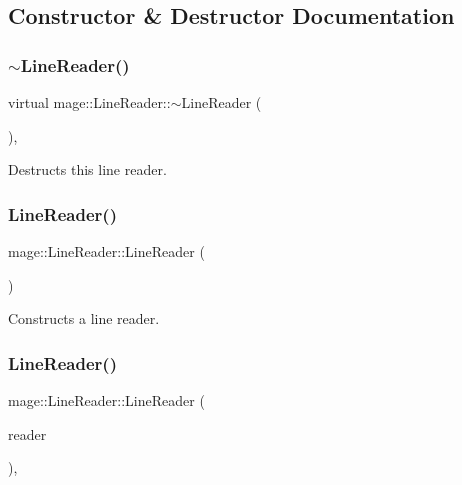 \subsection{Constructor \& Destructor Documentation}
\hypertarget{classmage_1_1_line_reader_aa058c338d8256d7f7b775bf4f7052508}{}\label{classmage_1_1_line_reader_aa058c338d8256d7f7b775bf4f7052508} 
\subsubsection{\texorpdfstring{$\sim$\+Line\+Reader()}{~LineReader()}}
{\footnotesize\ttfamily virtual mage\+::\+Line\+Reader\+::$\sim$\+Line\+Reader (\begin{DoxyParamCaption}{ }\end{DoxyParamCaption})\hspace{0.3cm}{\ttfamily [virtual]}, {\ttfamily [default]}}

Destructs this line reader. \hypertarget{classmage_1_1_line_reader_ab4a46321d7ea3ecda2d6390c78a7285b}{}\label{classmage_1_1_line_reader_ab4a46321d7ea3ecda2d6390c78a7285b} 
\subsubsection{\texorpdfstring{Line\+Reader()}{LineReader()}\hspace{0.1cm}{\footnotesize\ttfamily [1/3]}}
{\footnotesize\ttfamily mage\+::\+Line\+Reader\+::\+Line\+Reader (\begin{DoxyParamCaption}{ }\end{DoxyParamCaption})\hspace{0.3cm}{\ttfamily [protected]}}

Constructs a line reader. \hypertarget{classmage_1_1_line_reader_ae4f871bebae110704b34c0bd88460639}{}\label{classmage_1_1_line_reader_ae4f871bebae110704b34c0bd88460639} 
\subsubsection{\texorpdfstring{Line\+Reader()}{LineReader()}\hspace{0.1cm}{\footnotesize\ttfamily [2/3]}}
{\footnotesize\ttfamily mage\+::\+Line\+Reader\+::\+Line\+Reader (\begin{DoxyParamCaption}\item[{const \hyperlink{classmage_1_1_line_reader}{Line\+Reader} \&}]{reader }\end{DoxyParamCaption})\hspace{0.3cm}{\ttfamily [protected]}, {\ttfamily [delete]}}

